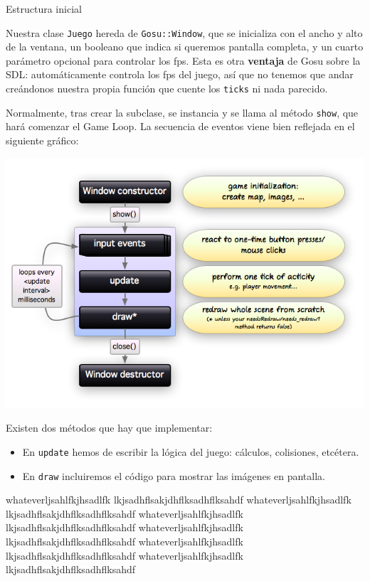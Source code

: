 \documentclass{article}
\begin{document}
\begin{singlespace}
  \begin{code}
    
    \caption{Estructura inicial}
  \end{code}
\end{singlespace}

\pagebreak

Nuestra clase \texttt{Juego} hereda de \texttt{Gosu::Window}, que se
inicializa con el ancho y alto de la ventana, un booleano que indica
si queremos pantalla completa, y un cuarto parámetro opcional para
controlar los fps. Esta es otra \textbf{ventaja} de Gosu sobre la SDL:
automáticamente controla los fps del juego, así que no tenemos que
andar creándonos nuestra propia función que cuente los \texttt{ticks}
ni nada parecido.

Normalmente, tras crear la subclase, se instancia y se llama al método
\texttt{show}, que hará comenzar el Game Loop. La secuencia de eventos
viene bien reflejada en el siguiente gráfico:

\begin{center}
  \includegraphics[width=14cm]{main_loop}
\end{center}



Existen dos métodos que hay que implementar:
\begin{itemize}
\item En \texttt{update} hemos de escribir la lógica del juego:
  cálculos, colisiones, etcétera.
  \item En \texttt{draw} incluiremos el código para mostrar las
    imágenes en pantalla.
\end{itemize}




whateverljsahlfkjhsadlfk
lkjsadhflsakjdhflksadhflksahdf
whateverljsahlfkjhsadlfk
lkjsadhflsakjdhflksadhflksahdf
whateverljsahlfkjhsadlfk
lkjsadhflsakjdhflksadhflksahdf
whateverljsahlfkjhsadlfk
lkjsadhflsakjdhflksadhflksahdf
whateverljsahlfkjhsadlfk
lkjsadhflsakjdhflksadhflksahdf
whateverljsahlfkjhsadlfk
lkjsadhflsakjdhflksadhflksahdf

\pagebreak
\end{document}
